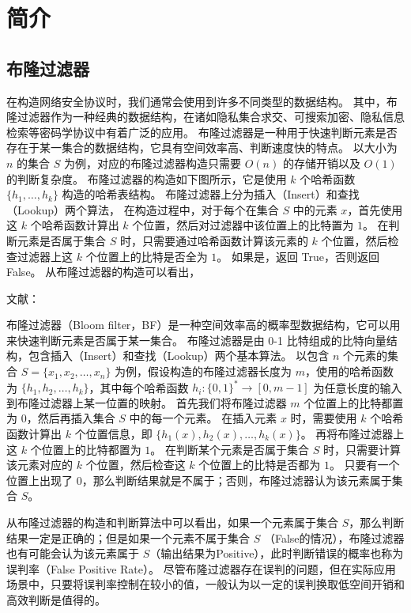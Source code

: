 
\chapter{简介}

\section{布隆过滤器}

在构造网络安全协议时，我们通常会使用到许多不同类型的数据结构。
其中，布隆过滤器作为一种经典的数据结构，在诸如隐私集合求交、可搜索加密、隐私信息检索等密码学协议中有着广泛的应用。
布隆过滤器是一种用于快速判断元素是否存在于某一集合的数据结构，它具有空间效率高、判断速度快的特点。
以大小为 $n$ 的集合 $S$ 为例，对应的布隆过滤器构造只需要 $O(n)$ 的存储开销以及 $O(1)$ 的判断复杂度。
布隆过滤器的构造如下图所示，它是使用 $k$ 个哈希函数 $\{h_1,\dots, h_k\}$ 构造的哈希表结构。
布隆过滤器上分为插入（Insert）和查找（Lookup）两个算法，
在构造过程中，对于每个在集合 $S$ 中的元素 $x$，首先使用这 $k$ 个哈希函数计算出 $k$ 个位置，然后对过滤器中该位置上的比特置为 $1$。
在判断元素是否属于集合 $S$ 时，只需要通过哈希函数计算该元素的 $k$ 个位置，然后检查过滤器上这 $k$ 个位置上的比特是否全为 $1$。
如果是，返回 True，否则返回 False。
从布隆过滤器的构造可以看出，


文献\cite{luo2019optimizing}：

布隆过滤器（Bloom filter，BF）是一种空间效率高的概率型数据结构，它可以用来快速判断元素是否属于某一集合。
布隆过滤器是由 0-1 比特组成的比特向量结构，包含插入（Insert）和查找（Lookup）两个基本算法。
以包含 $n$ 个元素的集合 $S=\{x_1, x_2, \dots, x_n\}$ 为例，假设构造的布隆过滤器长度为 $m$，使用的哈希函数为 $\{h_1, h_2, \dots, h_k\}$，其中每个哈希函数 $h_i:\{0,1\}^* \to [0, m-1]$ 为任意长度的输入到布隆过滤器上某一位置的映射。
首先我们将布隆过滤器 $m$ 个位置上的比特都置为 $0$，然后再插入集合 $S$ 中的每一个元素。
在插入元素 $x$ 时，需要使用 $k$ 个哈希函数计算出 $k$ 个位置信息，即 $\{h_1(x),h_2(x),\dots, h_k(x)\}$。
再将布隆过滤器上这 $k$ 个位置上的比特都置为 $1$。
在判断某个元素是否属于集合 $S$ 时，只需要计算该元素对应的 $k$ 个位置，然后检查这 $k$ 个位置上的比特是否都为 $1$。
只要有一个位置上出现了 $0$，那么判断结果就是不属于；否则，布隆过滤器认为该元素属于集合 $S$。

从布隆过滤器的构造和判断算法中可以看出，如果一个元素属于集合 $S$，那么判断结果一定是正确的；但是如果一个元素不属于集合 $S$ （False的情况），布隆过滤器也有可能会认为该元素属于 $S$（输出结果为Positive），此时判断错误的概率也称为误判率（False Positive Rate）。
尽管布隆过滤器存在误判的问题，但在实际应用场景中，只要将误判率控制在较小的值，一般认为以一定的误判换取低空间开销和高效判断是值得的。

